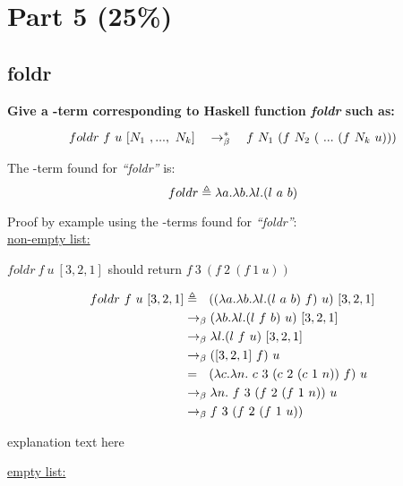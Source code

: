 \documentclass{article}
\begin{document}
	\section{Part 5 (25\%)}
	
	\begin{Large}
	\subsection{foldr}
		\textbf{Give a \lamb -term corresponding to Haskell function \textit{foldr} such as:}
		
		\begin{equation*}
			foldr \ f \ u \ [N_1 \ ,..., \ N_k] \quad \rightarrow_\beta^*\quad f \ N_1\ (f \ N_2 \ ( \ ... \ (f \ N_k \ u)))
		\end{equation*}
		\newline
		
		The \lamb -term found for \textit{``foldr''} is:
		\begin{equation*}
			foldr \triangleq \la a.\la b.\la l.(l \ a \ b)
		\end{equation*}
		\newline
		
		Proof by example using the \lamb -terms found for  \textit{``foldr''}:\\
		
		\underline{non-empty list:}
		\newline
		
		$foldr \ f \ u \ [3,2,1]$ should return $f \ 3 \ (f \ 2 \ (f \ 1 \ u))$
		
		\begin{align*}
			foldr \ f \ u \ [3,2,1] &\triangleq \saq ((\la a.\la b.\la l.(l \ a \ b) \ f) \ u) \ [3,2,1] \\
			&\equals (\la b.\la l.(l \ f \ b) \ u) \ [3,2,1] \\
			&\equals \la l.(l \ f \ u) \ [3,2,1] \\
			&\equals  ([3,2,1] \ f) \ u \\
			&= \saq  (\la c.\la n. \ c \ 3 \ (c \ 2 \ (c \ 1 \ n)) \ f) \ u \\
			&\equals \la n. \ f \ 3 \ (f \ 2 \ (f \ 1 \ n)) \ u \\
			&\equals f \ 3 \ (f \ 2 \ (f \ 1 \ u))
		\end{align*}
		\newline
		
		explanation text here
		\newline
		
		\underline{empty list:}
		\newline
		

\end{Large}
\end{document}
